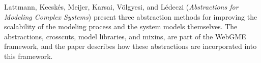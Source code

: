 


Lattmann, Kecsk\'{e}s, Meijer,
Karsai, V\"{o}lgyesi, and L\'{e}deczi
\cite{isola-2016-lattmann}
({\em Abstractions for Modeling Complex Systems})
present three abstraction methods for improving the scalability of the modeling process and the system models themselves. The abstractions, crosscuts, model libraries, and mixins, are part of the WebGME framework, and the paper describes how these abstractions are incorporated into this framework.


